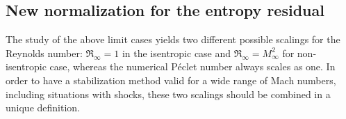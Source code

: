 %
%
%

\subsection{New normalization for the entropy residual} \label{sec:new_normaliz}

The study of the above limit cases yields two different possible scalings for the Reynolds number: $\Re_\infty = 1$ in the isentropic case and $\Re_\infty  = M_\infty^2$ for non-isentropic case, whereas the numerical P\'eclet number always scales as one. In order to have a stabilization method valid for a wide range of Mach numbers, including situations with shocks, these two scalings should be combined in a unique definition. 

